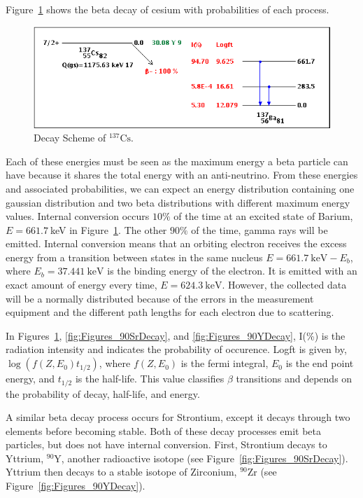 Figure~\ref{fig:Figures_137CsDecayScheme} shows the beta decay of cesium with probabilities of each process.
\begin{figure}
	[tbp] \centering 
	\includegraphics[width=.9
	\textwidth]{./Figures/137CsDecayScheme.png} \caption{Decay Scheme of $^{137}\textrm{Cs}$.\cite{nndc}} \label{fig:Figures_137CsDecayScheme} 
\end{figure}%
Each of these energies must be seen as the maximum energy a beta particle can have because it shares the total energy with an anti-neutrino. From these energies and associated probabilities, we can expect an energy distribution containing one gaussian distribution and two beta distributions with different maximum energy values. Internal conversion occurs $10\%$ of the time at an excited state of Barium, $E=661.7~$keV in Figure~\ref{fig:Figures_137CsDecayScheme}. The other $90\%$ of the time, gamma rays will be emitted. Internal conversion means that an orbiting electron receives the excess energy from a transition between states in the same nucleus $E=661.7~\text{keV}-E_b$, where $E_b=37.441~\text{keV}$ is the binding energy of the electron. It is emitted with an exact amount of energy every time, $E=624.3~\text{keV}$.  However, the collected data will be a normally distributed because of the errors in the measurement equipment and the different path lengths for each electron due to scattering.  

In Figures~\ref{fig:Figures_137CsDecayScheme}, \ref{fig:Figures_90SrDecay}, and \ref{fig:Figures_90YDecay}, I(\%) is the radiation intensity and indicates the probability of occurence.  Logft is given by, $\log(f(Z,E_0)t_{1/2})$, where $f(Z,E_0)$ is the fermi integral, $E_0$ is the end point energy, and $t_{1/2}$ is the half-life.  This value classifies $\beta$ transitions and depends on the probability of decay, half-life, and energy.\cite{nndc} 

A similar beta decay process occurs for Strontium, except it decays through two elements before becoming stable. Both of these decay processes emit beta particles, but does not have internal conversion. First, Strontium decays to Yttrium, $^{90}\text{Y}$, another radioactive isotope (see Figure~\ref{fig:Figures_90SrDecay}). Yttrium then decays to a stable isotope of Zirconium, $^{90}\text{Zr}$ (see Figure~\ref{fig:Figures_90YDecay}).

